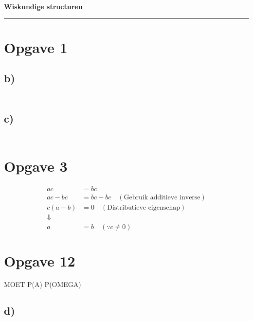 \documentclass{article}
\newcommand{\tx}[1]{\text{#1}}
\begin{document}
\begin{center}
    \Large \textbf{Wiskundige structuren}
\end{center}

\rule{\textwidth}{2pt}

\bigskip

\section*{Opgave 1}
\subsection*{b)}
\begin{align*}
\end{align*}
\subsection*{c)}
\begin{align*}
\end{align*}
\section*{Opgave 3}
\begin{align*}
    ac       & = bc                                              \\
    ac - bc  & = bc - bc \quad (\tx{Gebruik additieve inverse} ) \\
    c(a - b) & = 0 \quad (\tx{Distributieve eigenschap})         \\
    \Downarrow                                                   \\
    a        & = b \quad (\because c \neq 0)
\end{align*}


\section*{Opgave 12} MOET P(A) P(OMEGA)
\subsection*{d)}
\end{document}
